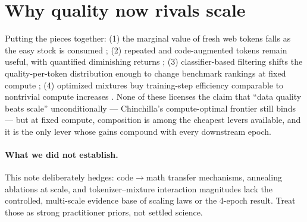 \documentclass[11pt]{article}
\begin{document}
\section{Why quality now rivals scale}
Putting the pieces together: (1) the marginal value of fresh web tokens falls as the easy stock is consumed \cite{villalobos2024will}; (2) repeated and code-augmented tokens remain useful, with quantified diminishing returns \cite{muennighoff2023scaling}; (3) classifier-based filtering shifts the quality-per-token distribution enough to change benchmark rankings at fixed compute \cite{penedo2024fineweb}; (4) optimized mixtures buy training-step efficiency comparable to nontrivial compute increases \cite{xie2023doremi}. None of these licenses the claim that ``data quality beats scale'' unconditionally --- Chinchilla's compute-optimal frontier still binds \cite{hoffmann2022chinchilla} --- but at fixed compute, composition is among the cheapest levers available, and it is the only lever whose gains compound with every downstream epoch.

\paragraph{What we did not establish.} This note deliberately hedges: code$\to$math transfer mechanisms, annealing ablations at scale, and tokenizer--mixture interaction magnitudes lack the controlled, multi-scale evidence base of scaling laws or the 4-epoch result. Treat those as strong practitioner priors, not settled science.



\end{document}
